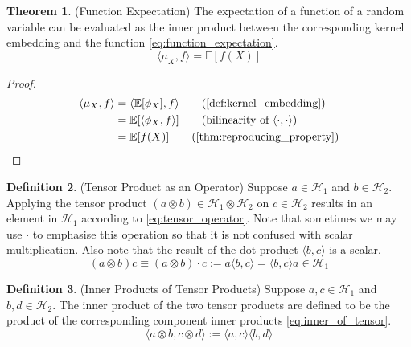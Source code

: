 \documentclass[twoside]{article} \usepackage{aistats2017}
\theoremstyle{definition}
\newtheorem{theorem}{Theorem}[section]
\newtheorem{definition}[theorem]{Definition}
\newcommand{\rv}[1]{{#1}}
\newcommand{\expect}[1]{{\mathbb{E}[#1]}}
\newcommand{\inner}[2]{{\langle #1, #2 \rangle}}
\newcommand{\muX}{\mu_{\rv{X}}}
\newcommand{\phiX}{\phi_{\rv{X}}}
\begin{document}
		\begin{theorem} \label{thm:function_expectation}
			(Function Expectation)
			The expectation of a function of a random variable can be evaluated as the inner product between the corresponding kernel embedding and the function \eqref{eq:function_expectation}.
			\begin{equation}
				\inner{\muX}{f} = \expect{f(\rv{X})}
				\label{eq:function_expectation}
			\end{equation}
			
			\begin{proof}
				\begin{align*}
					\inner{\muX}{f} &= \inner{\expect{\phiX}}{f} \tag{\cref{def:kernel_embedding}} \\
					&= \expect{\inner{\phiX}{f}} \tag{bilinearity of $\inner{\cdot}{\cdot}$} \\
					&= \expect{f(\rv{X})} \tag{\cref{thm:reproducing_property}}
				\end{align*}
			\end{proof}
		\end{theorem}
		
		\begin{definition} \label{def:tensor_operator}
			(Tensor Product as an Operator)
			Suppose $a \in \mathcal{H}_{1}$ and $b \in \mathcal{H}_{2}$. Applying the tensor product $(a \otimes b) \in \mathcal{H}_{1} \otimes \mathcal{H}_{2}$ on $c \in \mathcal{H}_{2}$ results in an element in $\mathcal{H}_{1}$ according to \eqref{eq:tensor_operator}. Note that sometimes we may use $\cdot$ to emphasise this operation so that it is not confused with scalar multiplication. Also note that the result of the dot product $\langle b, c \rangle$ is a scalar.
			\begin{equation}
				(a \otimes b) c \equiv (a \otimes b) \cdot c := a \langle b, c \rangle = \langle b, c \rangle a \in \mathcal{H}_{1}
			\label{eq:tensor_operator}
			\end{equation}
		\end{definition}
		
		\begin{definition} \label{def:inner_of_tensor}
			(Inner Products of Tensor Products)
			Suppose $a, c \in \mathcal{H}_{1}$ and $b, d \in \mathcal{H}_{2}$. The inner product of the two tensor products are defined to be the product of the corresponding component inner products \eqref{eq:inner_of_tensor}.
			\begin{equation}
				\inner{a \otimes b}{c \otimes d} := \inner{a}{c} \inner{b}{d}
			\label{eq:inner_of_tensor}
			\end{equation}
		\end{definition}
		
\end{document}
